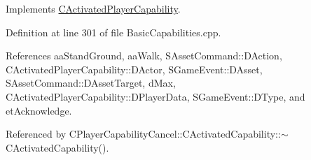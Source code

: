 Implements \hyperlink{classCActivatedPlayerCapability_a943b5999a57504399293250382c0ec6a}{C\+Activated\+Player\+Capability}.



Definition at line 301 of file Basic\+Capabilities.\+cpp.



References aa\+Stand\+Ground, aa\+Walk, S\+Asset\+Command\+::\+D\+Action, C\+Activated\+Player\+Capability\+::\+D\+Actor, S\+Game\+Event\+::\+D\+Asset, S\+Asset\+Command\+::\+D\+Asset\+Target, d\+Max, C\+Activated\+Player\+Capability\+::\+D\+Player\+Data, S\+Game\+Event\+::\+D\+Type, and et\+Acknowledge.



Referenced by C\+Player\+Capability\+Cancel\+::\+C\+Activated\+Capability\+::$\sim$\+C\+Activated\+Capability().



